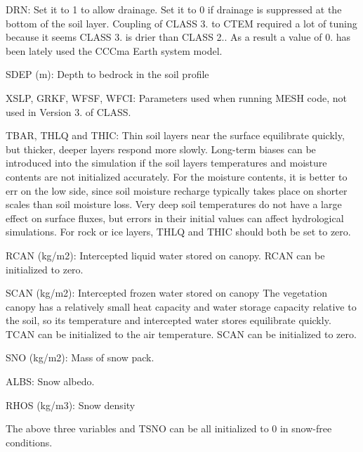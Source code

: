 \begin{DoxyItemize}
\item D\+R\+N\+: Set it to 1 to allow drainage. Set it to 0 if drainage is suppressed at the bottom of the soil layer. Coupling of C\+L\+A\+S\+S 3. to C\+T\+E\+M required a lot of tuning because it seems C\+L\+A\+S\+S 3. is drier than C\+L\+A\+S\+S 2.. As a result a value of 0. has been lately used the C\+C\+Cma Earth system model.
\item S\+D\+E\+P (m)\+: Depth to bedrock in the soil profile
\item X\+S\+L\+P, G\+R\+K\+F, W\+F\+S\+F, W\+F\+C\+I\+: Parameters used when running M\+E\+S\+H code, not used in Version 3. of C\+L\+A\+S\+S.
\item T\+B\+A\+R, T\+H\+L\+Q and T\+H\+I\+C\+: Thin soil layers near the surface equilibrate quickly, but thicker, deeper layers respond more slowly. Long-\/term biases can be introduced into the simulation if the soil layers temperatures and moisture contents are not initialized accurately. For the moisture contents, it is better to err on the low side, since soil moisture recharge typically takes place on shorter scales than soil moisture loss. Very deep soil temperatures do not have a large effect on surface fluxes, but errors in their initial values can affect hydrological simulations. For rock or ice layers, T\+H\+L\+Q and T\+H\+I\+C should both be set to zero.
\item R\+C\+A\+N (kg/m2)\+: Intercepted liquid water stored on canopy. R\+C\+A\+N can be initialized to zero.
\item S\+C\+A\+N (kg/m2)\+: Intercepted frozen water stored on canopy The vegetation canopy has a relatively small heat capacity and water storage capacity relative to the soil, so its temperature and intercepted water stores equilibrate quickly. T\+C\+A\+N can be initialized to the air temperature. S\+C\+A\+N can be initialized to zero.
\item S\+N\+O (kg/m2)\+: Mass of snow pack.
\item A\+L\+B\+S\+: Snow albedo.
\item R\+H\+O\+S (kg/m3)\+: Snow density
\end{DoxyItemize}

The above three variables and T\+S\+N\+O can be all initialized to 0 in snow-\/free conditions.


